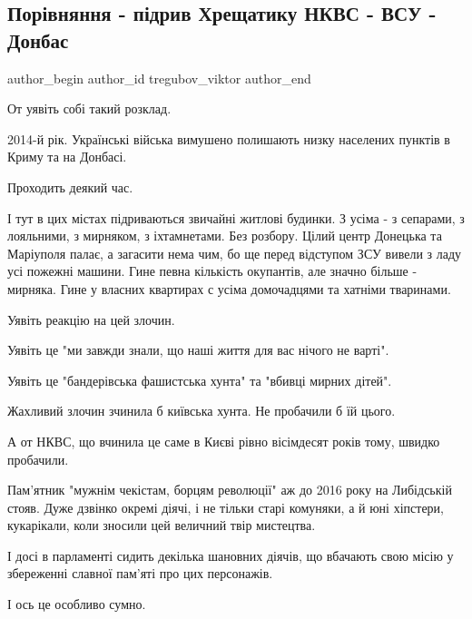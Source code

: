  
 
 
 
 
 
\subsection{Порівняння - підрив Хрещатику НКВС - ВСУ - Донбас}
\label{sec:23_09_2021.fb.tregubov_viktor.1.sravnenie_nkvd_donbass_vsu}
 
\ifcmt
 author_begin
   author_id tregubov_viktor
 author_end
\fi

От уявіть собі такий розклад.

2014-й рік. Українські війська вимушено полишають низку населених пунктів в
Криму та на Донбасі.

Проходить деякий час.

І тут в цих містах підриваються звичайні житлові будинки. З усіма - з сепарами,
з лояльними, з мирняком, з іхтамнетами. Без розбору. Цілий центр Донецька та
Маріуполя палає, а загасити нема чим, бо ще перед відступом ЗСУ вивели з ладу
усі пожежні машини. Гине певна кількість окупантів, але значно більше -
мирняка. Гине у власних квартирах с усіма домочадцями та хатніми тваринами.

Уявіть реакцію на цей злочин.

Уявіть це "ми завжди знали, що наші життя для вас нічого не варті".

Уявіть це "бандерівська фашистська хунта" та "вбивці мирних дітей".

Жахливий злочин зчинила б київська хунта. Не пробачили б їй цього.

А от НКВС, що вчинила це саме в Києві рівно вісімдесят років тому, швидко
пробачили.

Пам'ятник "мужнім чекістам, борцям революції" аж до 2016 року на Либідській
стояв. Дуже дзвінко окремі діячі, і не тільки старі комуняки, а й юні хіпстери,
кукарікали, коли зносили цей величний твір мистецтва.

І досі в парламенті сидить декілька шановних діячів, що вбачають свою місію у
збереженні славної пам'яті про цих персонажів.

І ось це особливо сумно.
